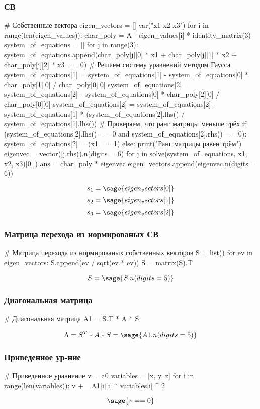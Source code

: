 \subsubsection{СВ}
\begin{sagesilent}
# Собственные вектора
eigen_vectors = []
var("x1 x2 x3")
for i in range(len(eigen_values)):
    char_poly = A - eigen_values[i] * identity_matrix(3)
    system_of_equations = []
    for j in range(3):
        system_of_equations.append(char_poly[j][0] * x1 + char_poly[j][1] * x2 + char_poly[j][2] * x3 == 0)
    # Решаем систему уравнений методом Гаусса
    system_of_equations[1] = system_of_equations[1] - system_of_equations[0] * char_poly[1][0] / char_poly[0][0]
    system_of_equations[2] = system_of_equations[2] - system_of_equations[0] * char_poly[2][0] / char_poly[0][0]
    system_of_equations[2] = system_of_equations[2] - system_of_equations[1] * (system_of_equations[2].lhs() / system_of_equations[1].lhs())
    # Проверяем, что ранг матрицы меньше трёх
    if (system_of_equations[2].lhs() == 0 and system_of_equations[2].rhs() == 0):
        system_of_equations[2] = (x1 == 1)
    else:
        print("Ранг матрицы равен трём")
    eigenvec = vector([j.rhs().n(digits = 6) for j in solve(system_of_equations, x1, x2, x3)[0]])
    ans = char_poly * eigenvec
    eigen_vectors.append(eigenvec.n(digits = 6))
\end{sagesilent}
$$s_1 = \sage{eigen_vectors[0]}$$
$$s_2 = \sage{eigen_vectors[1]}$$
$$s_3 = \sage{eigen_vectors[2]}$$


\subsubsection{Матрица перехода из нормированых СВ}
\begin{sagesilent}
# Матрица перехода из нормированых собственных векторов
S = list()
for ev in eigen_vectors:
    S.append(ev / sqrt(ev * ev))
S = matrix(S).T
\end{sagesilent}
$$S = \sage{S.n(digits = 5)}$$

\subsubsection{Диагональная матрица}
\begin{sagesilent}
# Диагональная матрица
A1 = S.T * A * S
\end{sagesilent}
$$\Lambda = S^T * A * S = \sage{A1.n(digits = 5)}$$

\subsubsection{Приведенное ур-ние}
\begin{sagesilent}
# Приведенное уравнение
v = a0
variables = [x, y, z]
for i in range(len(variables)):
    v += A1[i][i] * variables[i] ^ 2
\end{sagesilent}
$$\sage{v==0}$$

